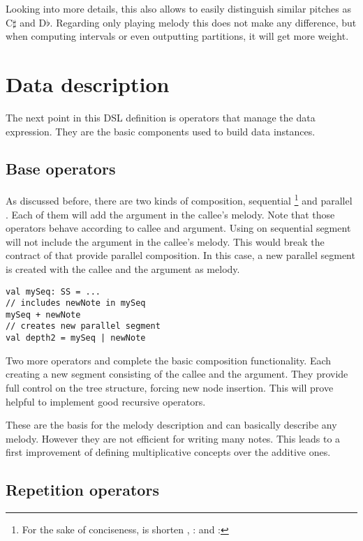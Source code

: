 \documentclass[twocolumn, 11pt]{article}
\begin{document}
Looking into more details, this also allows to easily distinguish similar pitches as C$\sharp$ and D$\flat$. Regarding only playing melody this does not make any difference, but when computing intervals or even outputting partitions, it will get more weight.

\section{Data description}

The next point in this DSL definition is operators that manage the data expression.
They are the basic components used to build data instances.


\subsection{Base operators}

As discussed before, there are two kinds of composition, sequential \footnote{For the sake of conciseness,  is shorten ,  :  and  : } and parallel . Each of them will add the  argument in the callee's melody. Note that those operators behave according to callee and argument. Using \lln{|} on sequential segment will not include the argument in the callee's melody. This would break the contract of \lln{|} that provide parallel composition. In this case, a new parallel segment is created with the callee and the argument as melody.
\begin{lstlisting}
val mySeq: SS = ...
// includes newNote in mySeq
mySeq + newNote
// creates new parallel segment
val depth2 = mySeq | newNote
\end{lstlisting}

Two more operators  and  complete the basic composition functionality. Each creating a new segment consisting of the callee and the argument. They provide full control on the tree structure, forcing new node insertion. This will prove helpful to implement good recursive operators.

These are the basis for the melody description and can basically describe any melody. However they are not efficient for writing many notes. This leads to a first improvement of defining multiplicative concepts over the additive ones.

\subsection{Repetition operators}
\end{document}
